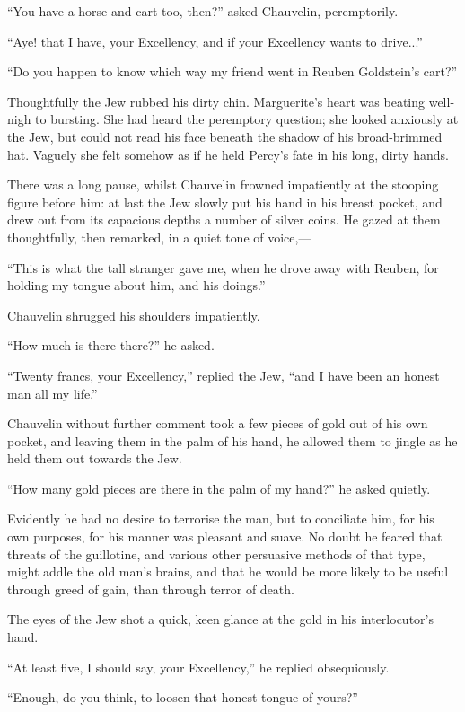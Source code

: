 \documentclass[paper=5.5in:8.5in,BCOR=7mm,twoside,DIV=calc,12pt,usegeometry,chapterprefix,endperiod,headings=big]{scrbook}
\begin{document}
\enquote{You have a horse and cart too, then?} asked Chauvelin, peremptorily.

\enquote{Aye! that I have, your Excellency, and if your Excellency wants to drive...}

\enquote{Do you happen to know which way my friend went in Reuben Goldstein's cart?}

Thoughtfully the Jew rubbed his dirty chin. Marguerite's heart was beating well-nigh to bursting. She had heard the peremptory question; she looked anxiously at the Jew, but could not read his face beneath the shadow of his broad-brimmed hat. Vaguely she felt somehow as if he held Percy's fate in his long, dirty hands.

There was a long pause, whilst Chauvelin frowned impatiently at the stooping figure before him: at last the Jew slowly put his hand in his breast pocket, and drew out from its capacious depths a number of silver coins. He gazed at them thoughtfully, then remarked, in a quiet tone of voice,---

\enquote{This is what the tall stranger gave me, when he drove away with Reuben, for holding my tongue about him, and his doings.}

Chauvelin shrugged his shoulders impatiently.

\enquote{How much is there there?} he asked.

\enquote{Twenty francs, your Excellency,} replied the Jew, \enquote{and I have been an honest man all my life.}

Chauvelin without further comment took a few pieces of gold out of his own pocket, and leaving them in the palm of his hand, he allowed them to jingle as he held them out towards the Jew.

\enquote{How many gold pieces are there in the palm of my hand?} he asked quietly.

Evidently he had no desire to terrorise the man, but to conciliate him, for his own purposes, for his manner was pleasant and suave. No doubt he feared that threats of the guillotine, and various other persuasive methods of that type, might addle the old man's brains, and that he would be more likely to be useful through greed of gain, than through terror of death.

The eyes of the Jew shot a quick, keen glance at the gold in his interlocutor's hand.

\enquote{At least five, I should say, your Excellency,} he replied obsequiously.

\enquote{Enough, do you think, to loosen that honest tongue of yours?}
\end{document}
